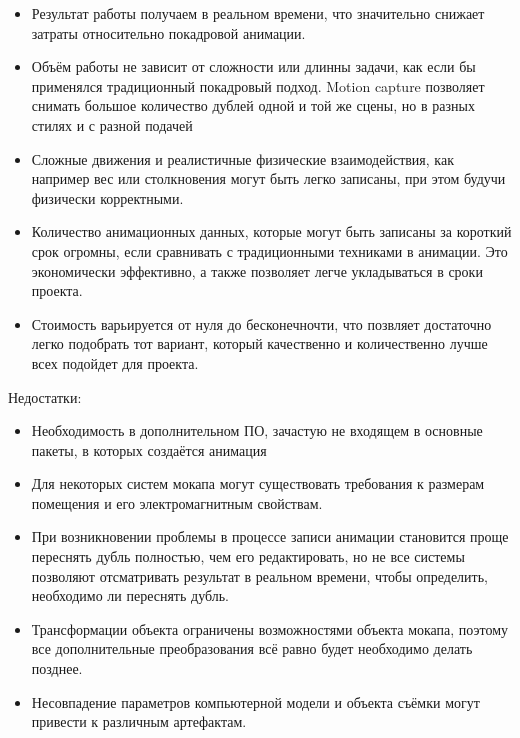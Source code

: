 \begin{itemize}
	\item Результат работы получаем в реальном времени, что значительно снижает затраты относительно покадровой анимации.
	\item Объём работы не зависит от сложности или длинны задачи, как если бы применялся традиционный покадровый подход. Motion capture позволяет снимать большое количество дублей одной и той же сцены, но в разных стилях и с разной подачей
	\item Сложные движения и реалистичные физические взаимодействия, как например вес или столкновения могут быть легко записаны, при этом будучи физически корректными.
	\item Количество анимационных данных, которые могут быть записаны за короткий срок огромны, если сравнивать с традиционными техниками в анимации. Это экономически эффективно, а также позволяет легче укладываться в сроки проекта.
	\item Стоимость варьируется от нуля до бесконечночти, что позвляет достаточно легко подобрать тот вариант, который качественно и количественно лучше всех подойдет для проекта.
\end{itemize}

Недостатки:
\begin{itemize}
	\item Необходимость в дополнительном ПО, зачастую не входящем в основные пакеты, в которых создаётся анимация
	\item Для некоторых систем мокапа могут существовать требования к размерам помещения и его электромагнитным свойствам.
	\item При возникновении проблемы в процессе записи анимации становится проще переснять дубль полностью, чем его редактировать, но не все системы позволяют отсматривать результат в реальном времени, чтобы определить, необходимо ли переснять дубль.
	\item Трансформации объекта ограничены возможностями объекта мокапа, поэтому все дополнительные преобразования всё равно будет необходимо делать позднее.
	\item Несовпадение параметров компьютерной модели и объекта съёмки могут привести к различным артефактам.
\end{itemize}
\clearpage
